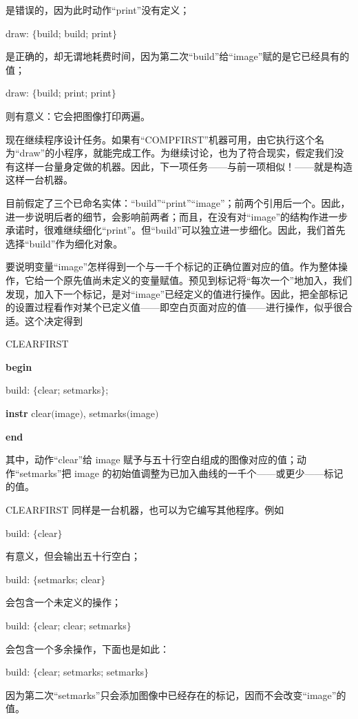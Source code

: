 \noindent
是错误的，因为此时动作“print”没有定义；

draw: $\{$build; build; print$\}$

\noindent
是正确的，却无谓地耗费时间，因为第二次“build”给“image”赋的是它已经具有的值；

draw: $\{$build; print; print$\}$

\noindent
则有意义：它会把图像打印两遍。

现在继续程序设计任务。如果有“COMPFIRST”机器可用，由它执行这个名为“draw”的小程序，就能完成工作。为继续讨论，也为了符合现实，假定我们没有这样一台量身定做的机器。因此，下一项任务——与前一项相似！——就是构造这样一台机器。

目前假定了三个已命名实体：“build”“print”“image”；前两个引用后一个。因此，进一步说明后者的细节，会影响前两者；而且，在没有对“image”的结构作进一步承诺时，很难继续细化“print”。但“build”可以独立进一步细化。因此，我们首先选择“build”作为细化对象。

要说明变量“image”怎样得到一个与一千个标记的正确位置对应的值。作为整体操作，它给一个原先值尚未定义的变量赋值。预见到标记将“每次一个”地加入，我们发现，加入下一个标记，是对“image”已经定义的值进行操作。因此，把全部标记的设置过程看作对某个已定义值——即空白页面对应的值——进行操作，似乎很合适。这个决定得到

CLEARFIRST

\textbf{begin}

\quad build: $\{$clear; setmarks$\}$;

\quad \textbf{instr} clear$($image$)$, setmarks$($image$)$

\textbf{end}

\noindent
其中，动作“clear”给 image 赋予与五十行空白组成的图像对应的值；动作“setmarks”把 image 的初始值调整为已加入曲线的一千个——或更少——标记的值。

CLEARFIRST 同样是一台机器，也可以为它编写其他程序。例如

build: $\{$clear$\}$

\noindent
有意义，但会输出五十行空白；

build: $\{$setmarks; clear$\}$

\noindent
会包含一个未定义的操作；

build: $\{$clear; clear; setmarks$\}$

\noindent
会包含一个多余操作，下面也是如此：

build: $\{$clear; setmarks; setmarks$\}$

\noindent
因为第二次“setmarks”只会添加图像中已经存在的标记，因而不会改变“image”的值。

